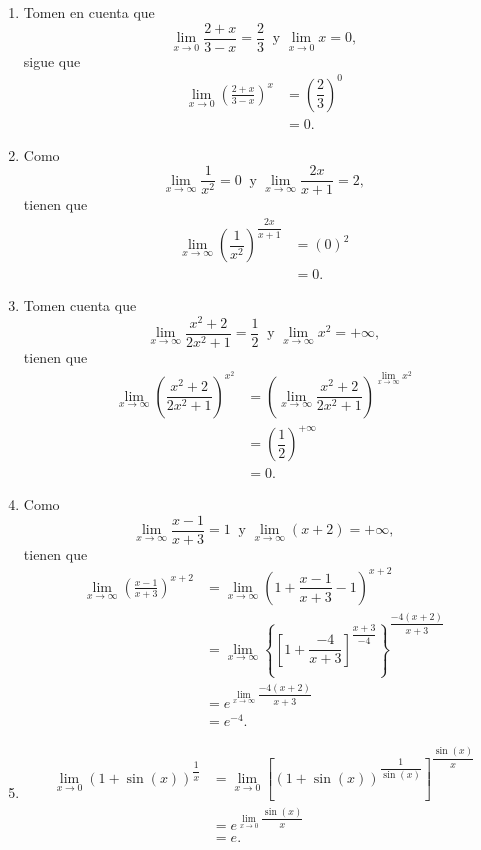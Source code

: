 \begin{example}
	\begin{enumerate}
		\item Tomen en cuenta que
		\[
		\lim\limits_{x\to 0}\dfrac{2+x}{3-x}=\dfrac{2}{3}\:\text{ y }\lim\limits_{x\to 0}x=0,
		\]
		sigue que
		\begin{align*}
		\lim\limits_{x\to 0}\left(\frac{2+x}{3-x}\right)^x&=\left(\dfrac{2}{3}\right)^0\\
		&=0.
		\end{align*}
		
		\item Como 
		\[
		\lim\limits_{x\to\infty}\dfrac{1}{x^2}=0\:\text{ y }\lim\limits_{x\to\infty}\dfrac{2x}{x+1}=2,
		\]
		tienen que
		\begin{align*}
		\lim\limits_{x\to \infty}\left(\dfrac{1}{x^2}\right)^{\dfrac{2x}{x+1}}&=(0)^2\\
		&=0.
		\end{align*}
		
		\item Tomen cuenta que
		\[
		\lim\limits_{x\to\infty}\dfrac{x^2+2}{2x^2+1}=\dfrac{1}{2}\:\text{ y }\lim\limits_{x\to\infty}x^2=+\infty,
		\]
		tienen que
		\begin{align*}
		\lim\limits_{x\to\infty}\left(\dfrac{x^2+2}{2x^2+1}\right)^{x^2}&=\left(\lim\limits_{x\to\infty}\dfrac{x^2+2}{2x^2+1}\right)^{\lim\limits_{x\to\infty}x^2}\\
			&=\left(\dfrac{1}{2}\right)^{+\infty}\\
			&=0.
		\end{align*}
		
		\item Como
		\[
		\lim\limits_{x\to\infty}\dfrac{x-1}{x+3}=1\:\text{ y }\lim\limits_{x\to\infty}(x+2)=+\infty,
		\]
		tienen que
		\begin{align*}
		\lim\limits_{x\to\infty}\left(\frac{x-1}{x+3}\right)^{x+2}&=\lim\limits_{x\to\infty}\left(1+\dfrac{x-1}{x+3}-1\right)^{x+2}\\
		&=\lim\limits_{x\to\infty}\left\{\left[1+\dfrac{-4}{x+3}\right]^{\dfrac{x+3}{-4}}	\right\}^{\dfrac{-4(x+2)}{x+3}}\\
		&=e^{\lim\limits_{x\to\infty}\dfrac{-4(x+2)}{x+3}}\\
		&=e^{-4}.
		\end{align*}
		
		\item \begin{align*}
		\lim\limits_{x\to 0}\left(1+\sin(x)\right)^{\dfrac{1}{x}}&=\lim\limits_{x\to 0}\left[\left(1+\sin(x)\right)^{\dfrac{1}{\sin(x)}}\right]^{\dfrac{\sin(x)}{x}}\\
		&=e^{\lim\limits_{x\to 0}\dfrac{\sin(x)}{x}}\\
		&=e.
		\end{align*}
		

\end{enumerate}
\end{example}
